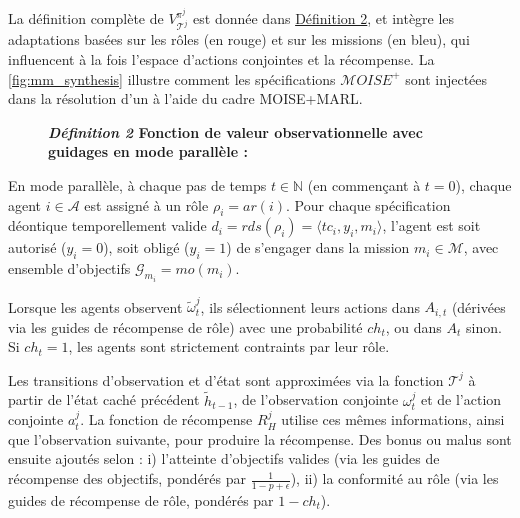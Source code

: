 La définition complète de $V_{\mathcal{T}^j}^{\pi^j}$ est donnée dans \hyperref[eq:single_value_function]{Définition 2}, et intègre les adaptations basées sur les rôles (en rouge) et sur les missions (en bleu), qui influencent à la fois l'espace d'actions conjointes et la récompense. La \autoref{fig:mm_synthesis} illustre comment les spécifications $\mathcal{M}OISE^+$ sont injectées dans la résolution d'un  à l'aide du cadre MOISE+MARL.

\begin{figure}[h!]
    \label{eq:single_value_function}
    \raggedright
    \textbf{\textit{Définition 2} \quad Fonction de valeur observationnelle avec guidages en mode parallèle :}

    \begin{scriptsize}
    \end{scriptsize}
\end{figure}

\noindent En mode parallèle, à chaque pas de temps $t \in \mathbb{N}$ (en commençant à $t=0$), chaque agent $i \in \mathcal{A}$ est assigné à un rôle $\rho_i = ar(i)$. Pour chaque spécification déontique temporellement valide $d_i = rds(\rho_i) = \langle tc_i, y_i, m_i \rangle$, l'agent est soit autorisé ($y_i = 0$), soit obligé ($y_i = 1$) de s'engager dans la mission $m_i \in \mathcal{M}$, avec ensemble d'objectifs $\mathcal{G}_{m_i} = mo(m_i)$.

Lorsque les agents observent $\tilde{\omega}_t^j$, ils sélectionnent leurs actions dans $A_{i,t}$ (dérivées via les guides de récompense de rôle) avec une probabilité $ch_t$, ou dans $A_t$ sinon. Si $ch_t = 1$, les agents sont strictement contraints par leur rôle.

Les transitions d'observation et d'état sont approximées via la fonction $\mathcal{T}^j$ à partir de l'état caché précédent $\tilde{h}_{t-1}$, de l'observation conjointe $\omega^j_t$ et de l'action conjointe $a^j_t$. La fonction de récompense $R^j_H$ utilise ces mêmes informations, ainsi que l'observation suivante, pour produire la récompense. Des bonus ou malus sont ensuite ajoutés selon :
i) l'atteinte d'objectifs valides (via les guides de récompense des objectifs, pondérés par $\frac{1}{1 - p + \epsilon}$),
ii) la conformité au rôle (via les guides de récompense de rôle, pondérés par $1 - ch_t$).

